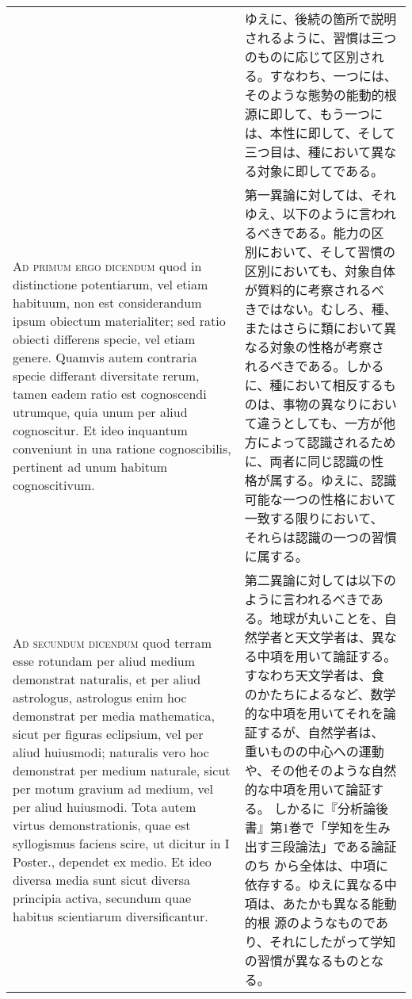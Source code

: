 \documentclass[10pt]{jsarticle}
\begin{document}
\begin{longtable}{p{21em}p{21em}}
&

ゆえに、後続の箇所で説明されるように、習慣は三つのものに応じて区別され
る。すなわち、一つには、そのような態勢の能動的根源に即して、もう一つに
は、本性に即して、そして三つ目は、種において異なる対象に即してである。

\\

{\scshape Ad primum ergo dicendum} quod in distinctione potentiarum,
vel etiam habituum, non est considerandum ipsum obiectum materialiter;
sed ratio obiecti differens specie, vel etiam genere. Quamvis autem
contraria specie differant diversitate rerum, tamen eadem ratio est
cognoscendi utrumque, quia unum per aliud cognoscitur. Et ideo
inquantum conveniunt in una ratione cognoscibilis, pertinent ad unum
habitum cognoscitivum.

&

第一異論に対しては、それゆえ、以下のように言われるべきである。能力の区
別において、そして習慣の区別においても、対象自体が質料的に考察されるべ
きではない。むしろ、種、またはさらに類において異なる対象の性格が考察さ
れるべきである。しかるに、種において相反するものは、事物の異なりにおい
て違うとしても、一方が他方によって認識されるために、両者に同じ認識の性
格が属する。ゆえに、認識可能な一つの性格において一致する限りにおいて、
それらは認識の一つの習慣に属する。

\\

{\scshape Ad secundum dicendum} quod terram esse rotundam per aliud
medium demonstrat naturalis, et per aliud astrologus, astrologus enim
hoc demonstrat per media mathematica, sicut per figuras eclipsium, vel
per aliud huiusmodi; naturalis vero hoc demonstrat per medium
naturale, sicut per motum gravium ad medium, vel per aliud
huiusmodi. Tota autem virtus demonstrationis, quae est syllogismus
faciens scire, ut dicitur in I Poster., dependet ex medio. Et ideo
diversa media sunt sicut diversa principia activa, secundum quae
habitus scientiarum diversificantur.

&

第二異論に対しては以下のように言われるべきである。地球が丸いことを、自
然学者と天文学者は、異なる中項を用いて論証する。すなわち天文学者は、食
のかたちによるなど、数学的な中項を用いてそれを論証するが、自然学者は、
重いものの中心への運動や、その他そのような自然的な中項を用いて論証する。
しかるに『分析論後書』第1巻で「学知を生み出す三段論法」である論証のち
から全体は、中項に依存する。ゆえに異なる中項は、あたかも異なる能動的根
源のようなものであり、それにしたがって学知の習慣が異なるものとなる。


\end{longtable}
\end{document}
